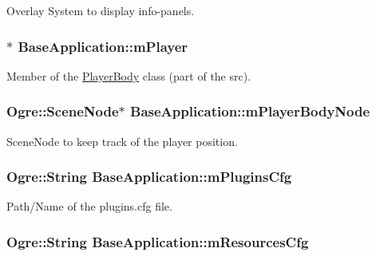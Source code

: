 \-Overlay \-System to display info-\/panels. \hypertarget{classBaseApplication_a741eec58ff4787a66ce1533517afe1b1}{
\subsubsection[{m\-Player}]{$\ast$ {\bf \-Base\-Application\-::m\-Player}}}\label{classBaseApplication_a741eec58ff4787a66ce1533517afe1b1}
\-Member of the \hyperlink{classPlayerBody}{\-Player\-Body} class (part of the src). \hypertarget{classBaseApplication_a8c690de5ec96338aa911ae113115da66}{
\subsubsection[{m\-Player\-Body\-Node}]{\setlength{\rightskip}{0pt plus 5cm}\-Ogre\-::\-Scene\-Node$\ast$ {\bf \-Base\-Application\-::m\-Player\-Body\-Node}}}\label{classBaseApplication_a8c690de5ec96338aa911ae113115da66}
\-Scene\-Node to keep track of the player position. \hypertarget{classBaseApplication_a04f2fe47fa164fd78d986dc0df70b7fb}{
\subsubsection[{m\-Plugins\-Cfg}]{\setlength{\rightskip}{0pt plus 5cm}\-Ogre\-::\-String {\bf \-Base\-Application\-::m\-Plugins\-Cfg}}}\label{classBaseApplication_a04f2fe47fa164fd78d986dc0df70b7fb}
\-Path/\-Name of the plugins.\-cfg file. \hypertarget{classBaseApplication_a765e0df01c141a16df3178ab4f17afe6}{
\subsubsection[{m\-Resources\-Cfg}]{\setlength{\rightskip}{0pt plus 5cm}\-Ogre\-::\-String {\bf \-Base\-Application\-::m\-Resources\-Cfg}}}\label{classBaseApplication_a765e0df01c141a16df3178ab4f17afe6}
